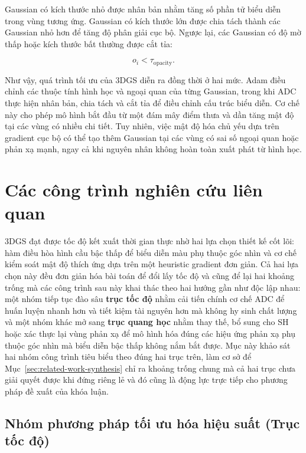Gaussian có kích thước nhỏ được nhân bản nhằm tăng số phần tử biểu diễn trong vùng tương ứng. Gaussian có kích thước lớn được chia tách thành các Gaussian nhỏ hơn để tăng độ phân giải cục bộ. Ngược lại, các Gaussian có độ mờ thấp hoặc kích thước bất thường được cắt tỉa:

\begin{equation}
    o_i
    <
    \tau_{\mathrm{opacity}}.
    \label{eq:3dgs-opacity-pruning}
\end{equation}

Như vậy, quá trình tối ưu của 3DGS diễn ra đồng thời ở hai mức. Adam điều chỉnh các thuộc tính hình học và ngoại quan của từng Gaussian, trong khi ADC thực hiện nhân bản, chia tách và cắt tỉa để điều chỉnh cấu trúc biểu diễn. Cơ chế này cho phép mô hình bắt đầu từ một đám mây điểm thưa và dần tăng mật độ tại các vùng có nhiều chi tiết. Tuy nhiên, việc mật độ hóa chủ yếu dựa trên gradient cục bộ có thể tạo thêm Gaussian tại các vùng có sai số ngoại quan hoặc phản xạ mạnh, ngay cả khi nguyên nhân không hoàn toàn xuất phát từ hình học.

\section{Các công trình nghiên cứu liên quan}
\label{sec:related-work}

3DGS đạt được tốc độ kết xuất thời gian thực nhờ hai lựa chọn thiết kế cốt lõi: hàm điều hòa hình cầu bậc thấp để biểu diễn màu phụ thuộc góc nhìn và cơ chế kiểm soát mật độ thích ứng dựa trên một heuristic gradient đơn giản. Cả hai lựa chọn này đều đơn giản hóa bài toán để đổi lấy tốc độ và cũng để lại hai khoảng trống mà các công trình sau này khai thác theo hai hướng gần như độc lập nhau: một nhóm tiếp tục đào sâu \textbf{trục tốc độ} nhằm cải tiến chính cơ chế ADC để huấn luyện nhanh hơn và tiết kiệm tài nguyên hơn mà không hy sinh chất lượng và một nhóm khác mở sang \textbf{trục quang học} nhằm thay thế, bổ sung cho SH hoặc xác thực lại vùng phản xạ để mô hình hóa đúng các hiệu ứng phản xạ phụ thuộc góc nhìn mà biểu diễn bậc thấp không nắm bắt được. Mục này khảo sát hai nhóm công trình tiêu biểu theo đúng hai trục trên, làm cơ sở để Mục~\ref{sec:related-work-synthesis} chỉ ra khoảng trống chung mà cả hai trục chưa giải quyết được khi đứng riêng lẻ và đó cũng là động lực trực tiếp cho phương pháp đề xuất của khóa luận.

\subsection{Nhóm phương pháp tối ưu hóa hiệu suất (Trục tốc độ)}
\label{subsec:rw-speed}

